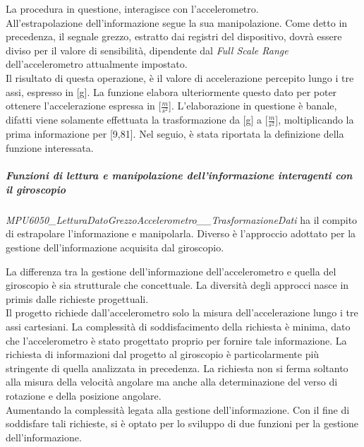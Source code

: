 La procedura in questione, interagisce con l'accelerometro.\\
All'estrapolazione dell'informazione segue la sua manipolazione. Come detto in precedenza, il segnale grezzo, estratto dai registri del dispositivo, dovrà essere diviso per il valore di sensibilità, dipendente dal \textit{Full Scale Range} dell'accelerometro attualmente impostato.\\
Il risultato di questa operazione, è il valore di accelerazione percepito lungo i tre assi, espresso in [g]. La funzione elabora ulteriormente questo dato per poter ottenere l'accelerazione espressa in [$\frac{m}{s^2}$]. L'elaborazione in questione è banale, difatti viene solamente effettuata la trasformazione da [g] a [$\frac{m}{s^2}$], moltiplicando la prima informazione per [9,81].
Nel seguio, è stata riportata la definizione della funzione interessata.


\subparagraph{Funzioni di lettura e manipolazione dell'informazione interagenti con il giroscopio}
\textit{MPU6050\_LetturaDatoGrezzoAccelerometro\_\_TrasformazioneDati} ha il compito di estrapolare l'informazione e manipolarla. Diverso è l'approccio adottato per la gestione dell'informazione acquisita dal giroscopio.

La differenza tra la gestione dell'informazione dell'accelerometro e quella del giroscopio è sia strutturale che concettuale. La diversità degli approcci nasce in primis dalle richieste progettuali.\\
Il progetto richiede dall'accelerometro solo la misura dell'accelerazione lungo i tre assi cartesiani. La complessità di soddisfacimento della richiesta è minima, dato che l'accelerometro è stato progettato proprio per fornire tale informazione.
La richiesta di informazioni dal progetto al giroscopio è particolarmente più stringente di quella analizzata in precedenza. La richiesta non si ferma soltanto alla misura della velocità angolare ma anche alla determinazione del verso di rotazione e della posizione angolare.\\
Aumentando la complessità legata alla gestione dell'informazione.
Con il fine di soddisfare tali richieste, si è optato per lo sviluppo di due funzioni per la gestione dell'informazione.

